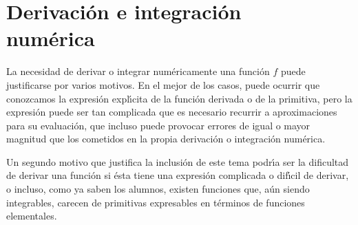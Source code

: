 


\chapter[Derivaci\'on e integraci\'on num\'erica]
        {Derivaci\'on e integraci\'on \\ num\'erica}

La necesidad de derivar o integrar num\'ericamente una funci\'on $f$ puede justificarse por varios motivos. En el mejor de los casos, puede ocurrir que conozcamos la expresi\'on expl\'{\i}cita de la funci\'on derivada o de la primitiva, pero la expresi\'{o}n puede ser tan complicada que es necesario recurrir a aproximaciones para su evaluaci\'{o}n, que incluso puede provocar errores de igual o mayor magnitud que los cometidos en la propia derivaci\'on o integraci\'on num\'erica. 

Un segundo motivo que justifica la inclusi\'on de este tema podr\'{\i}a ser la dificultad de derivar una funci\'on si \'esta tiene una expresi\'on complicada o dif\'{\i}cil de derivar, o incluso, como ya saben los alumnos, existen funciones que, a\'un siendo integrables, carecen de primitivas expresables en t\'erminos de funciones elementales. 
  
